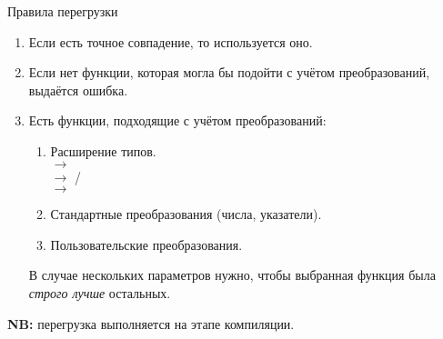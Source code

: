 \documentclass{beamer}
\begin{document}
\begin{frame}[fragile]{Правила перегрузки}
    \begin{enumerate}
        \item Если есть точное совпадение, то используется оно.

        \item Если нет функции, которая могла бы подойти с учётом преобразований,
            выдаётся ошибка.

        \item Есть функции, подходящие с учётом преобразований:

            \begin{enumerate}
                \item Расширение типов.\\
                     $\to$ \\
                     $\to$ /\\
                     $\to$ 

                \item Стандартные преобразования (числа, указатели).
                \item Пользовательские преобразования.
            \end{enumerate}
            В случае нескольких параметров нужно, чтобы выбранная функция была
            {\em строго лучше} остальных.
    \end{enumerate}
    {\bf NB:} перегрузка выполняется на этапе компиляции.
\end{frame}
\end{document}
